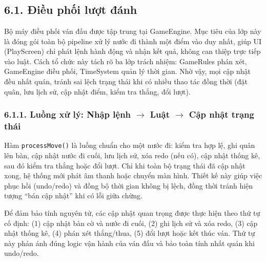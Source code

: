 \newpage
\chapter*{}
\setlength{\parindent}{1.5em}

\section*{6.1. Điều phối lượt đánh}

\setlength{\parindent}{1.5em} Bộ máy điều phối ván đấu được tập trung tại GameEngine. Mục tiêu của lớp này là đóng gói toàn bộ pipeline xử lý nước đi thành một điểm vào duy nhất, giúp UI (PlayScreen) chỉ phát lệnh hành động và nhận kết quả, không can thiệp trực tiếp vào luật. Cách tổ chức này tách rõ ba lớp trách nhiệm: GameRules phán xét, GameEngine điều phối, TimeSystem quản lý thời gian. Nhờ vậy, mọi cập nhật đều nhất quán, tránh sai lệch trạng thái khi có nhiều thao tác đồng thời (đặt quân, lưu lịch sử, cập nhật điểm, kiểm tra thắng, đổi lượt).

\subsection*{6.1.1. Luồng xử lý: Nhập lệnh \texorpdfstring{$\rightarrow$}{} Luật \texorpdfstring{$\rightarrow$}{} Cập nhật trạng thái}

\setlength{\parindent}{1.5em} Hàm \texttt{processMove()} là luồng chuẩn cho một nước đi: kiểm tra hợp lệ, ghi quân lên bàn, cập nhật nước đi cuối, lưu lịch sử, xóa redo (nếu có), cập nhật thống kê, sau đó kiểm tra thắng hoặc đổi lượt. Chỉ khi toàn bộ trạng thái đã cập nhật xong, hệ thống mới phát âm thanh hoặc chuyển màn hình. Thiết kế này giúp việc phục hồi (undo/redo) và đồng bộ thời gian không bị lệch, đồng thời tránh hiện tượng “bán cập nhật” khi có lỗi giữa chừng.

\setlength{\parindent}{1.5em} Để đảm bảo tính nguyên tử, các cập nhật quan trọng được thực hiện theo thứ tự cố định: (1) cập nhật bàn cờ và nước đi cuối, (2) ghi lịch sử và xóa redo, (3) cập nhật thống kê, (4) phán xét thắng/thua, (5) đổi lượt hoặc kết thúc ván. Thứ tự này phản ánh đúng logic vận hành của ván đấu và bảo toàn tính nhất quán khi undo/redo.

